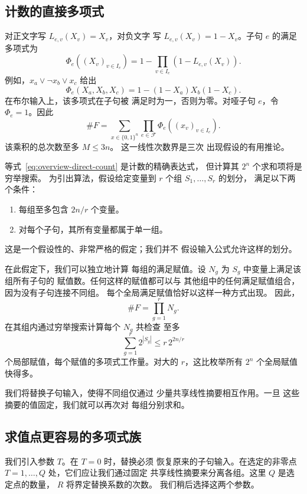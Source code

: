 \documentclass[11pt,reqno]{amsart}
\numberwithin{equation}{section}
\theoremstyle{definition}\newtheorem{definition}[theorem]{定义}
\theoremstyle{remark}\newtheorem{remark}[theorem]{注}
\renewcommand{\le}{\leqslant}
\begin{document}
\subsection{计数的直接多项式}\label{subsec:preview-encoding}
对正文字写 $L_{e,v}(X_v)=X_v$，对负文字
写 $L_{e,v}(X_v)=1-X_v$。子句 $e$ 的满足
多项式为
\[
 \Phi_e((X_v)_{v\in I_e})
 =1-\prod_{v\in I_e}(1-L_{e,v}(X_v)).
\]
例如，$x_a\vee\neg x_b\vee x_c$ 给出
\[
 \Phi_e(X_a,X_b,X_c)=1-(1-X_a)X_b(1-X_c).
\]
在布尔输入上，该多项式在子句被
满足时为一，否则为零。对哑子句 $e$，令
$\Phi_e=1$。因此
\begin{equation}\label{eq:overview-direct-count}
 \#F=\sum_{x\in\{0,1\}^n}\prod_{e\in\mathcal F}
                   \Phi_e((x_v)_{v\in I_e}).
\end{equation}
该乘积的总次数至多 $M\le3n$。
这一线性次数界是三次
出现假设的有用推论。

等式~\eqref{eq:overview-direct-count} 是计数的精确表达式，
但计算其 $2^n$ 个求和项将是穷举搜索。
为引出算法，假设给定变量到 $r$ 个组 $S_1,\ldots,S_r$ 的划分，
满足以下两个条件：
\begin{enumerate}
\item 每组至多包含 $2n/r$ 个变量。
\item 对每个子句，其所有变量都属于单一组。
\end{enumerate}
这是一个假设性的、非常严格的假定；我们并不
假设输入公式允许这样的划分。

在此假定下，我们可以独立地计算
每组的满足赋值。设 $N_g$ 为 $S_g$ 中变量上满足该组所有子句的
赋值数。任何这样的赋值都可以与
其他组中的任何满足赋值组合，因为没有子句连接不同组。
每个全局满足赋值恰好以这样一种方式出现。
因此，
\[
 \#F=\prod_{g=1}^r N_g.
\]
在其组内通过穷举搜索计算每个 $N_g$ 共检查
至多
\[
 \sum_{g=1}^r 2^{|S_g|}\le r\,2^{2n/r}
\]
个局部赋值，每个赋值的多项式工作量。对大的
$r$，这比枚举所有 $2^n$ 个全局赋值快得多。

我们将替换子句输入，使得不同组仅通过
少量共享线性摘要相互作用。一旦
这些摘要的值固定，我们就可以再次对
每组分别求和。

\subsection{求值点更容易的多项式族}
\label{subsec:preview-deformation}
我们引入参数 $T$。在 $T=0$ 时，替换必须
恢复原来的子句输入。在选定的非零点
$T=1,\ldots,Q$ 处，它们应让我们通过固定
共享线性摘要来分离各组。这里 $Q$ 是选定点的数量，
$R$ 将界定替换系数的次数。
我们稍后选择这两个参数。
\end{document}
